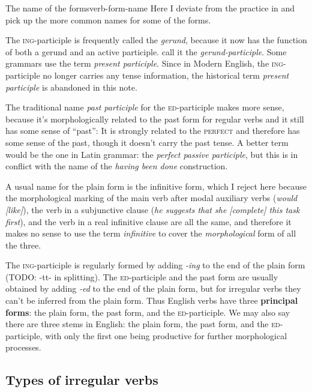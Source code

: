 \documentclass[UTF8, a4paper, oneside, scheme=plain, 12pt]{ctexbook}
\newcommand*{\citechap}[1]{Ch~{#1}}
\newcommand*{\concept}[1]{\textbf{#1}}
\newcommand*{\term}[1]{\emph{#1}}
\newcommand{\form}[1]{\emph{#1}}
\newcommand{\category}[1]{\textsc{#1}}
\newcommand{\formcat}[1]{\textsc{#1}}
\begin{document}
\begin{infobox}{The name of the forms}{verb-form-name}
    Here I deviate from the practice in \citep[\citechap{3}]{cgel} 
    and pick up the more common names for some of the forms. 

    The \formcat{ing}-participle is frequently called the \term{gerund},
    because it now has the function of both a gerund and an active participle.
    \citet{cgel} call it the \term{gerund-participle}.
    Some grammars use the term \term{present participle}.
    Since in Modern English,
    the \formcat{ing}-participle no longer carries any tense information,
    the historical term \term{present participle} is abandoned in this note.

    The traditional name \term{past participle} for the \formcat{ed}-participle makes more sense,
    because it's morphologically related to the past form for regular verbs 
    and it still has some sense of ``past'':
    It is strongly related to the \category{perfect} and therefore has some sense of the past,
    though it doesn't carry the past tense.
    A better term would be the one in Latin grammar: the \term{perfect passive participle},
    but this is in conflict with the name of the \form{having been done} construction.

    A usual name for the plain form is the infinitive form,
    which I reject here because the morphological marking of 
    the main verb after modal auxiliary verbs  
    (\form{would [like]}),
    the verb in a subjunctive clause 
    (\form{he suggests that she [complete] this task first}),
    and the verb in a real infinitive clause are all the same,
    and therefore it makes no sense to use the term \term{infinitive} 
    to cover the \emph{morphological} form of all the three.
\end{infobox}

The \formcat{ing}-participle is regularly formed by adding \form{-ing} to the end of the plain form
(TODO: -tt- in splitting).
The \formcat{ed}-participle and the past form are usually obtained 
by adding \form{-ed} to the end of the plain form,
but for irregular verbs they can't be inferred from the plain form.
Thus English verbs have three \concept{principal forms}:
the plain form, the past form, and the \formcat{ed}-participle.
We may also say there are three stems in English:
the plain form, the past form, and the \formcat{ed}-participle,
with only the first one being productive for further morphological processes.

\subsection{Types of irregular verbs}
\end{document}
